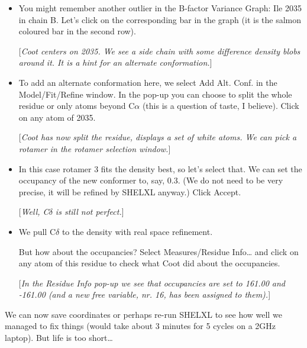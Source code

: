 \documentclass{article}
\begin{document}
\begin{itemize}
\item You might remember another outlier in the B-factor Variance Graph: Ile 2035 in chain B. Let's click on the corresponding bar in the graph (it is the salmon coloured bar in the second row).

[\textsl{Coot centers on 2035. We see a side chain with some difference density blobs around it. It is a hint for an alternate conformation.}]

\item To add an alternate conformation here, we select \textsf{Add Alt. Conf.} in the \textsf{Model/Fit/Refine} window. In the pop-up you can choose to split the whole residue or only atoms beyond C$\alpha$ (this is a question of taste, I believe). Click on any atom of 2035.

[\textsl{Coot has now split the residue, displays a set of white atoms. We can pick a rotamer in the rotamer selection window.}]

\item In this case rotamer 3 fits the density best, so let's select that. We can set the occupancy of the new conformer to, say, 0.3. (We do not need to be very precise, it will be refined by SHELXL anyway.) Click \textsf{Accept}.

[\textsl{Well, C$\delta$ is still not perfect.}]

\item We pull C$\delta$ to the density with real space refinement.

But how about the occupancies? Select \textsf{Measures/Residue Info\ldots} and click on any atom of this residue to check what Coot did about the occupancies.

[\textsl{In the \textsf{Residue Info} pop-up we see that occupancies are set to 161.00 and -161.00 (and a new free variable, nr. 16, has been assigned to them).}]

\end{itemize}

We can now save coordinates or perhaps re-run SHELXL to see how well we managed to fix things (would take about 3 minutes for 5 cycles on a 2GHz laptop). But life is too short\ldots
\end{document}
